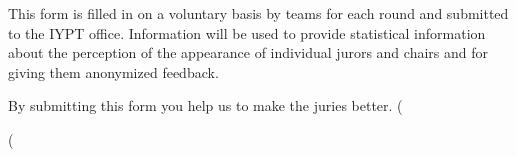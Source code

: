 		This form is filled in on a voluntary basis by teams for each round and submitted to the IYPT office. Information will
		be used to provide statistical information about the perception of the appearance of individual jurors and chairs and
		for giving them anonymized feedback.

        By submitting this form you help us to make the juries better.
        \newpage
	(%

(%